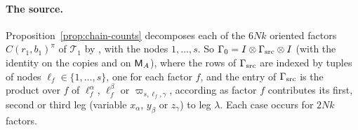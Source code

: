 \paragraph{The source.}
Proposition~\ref{prop:chain-counts} decomposes each of the \(6Nk\) oriented
factors \(C(r_1,b_1)^\pi\) of \(\mathcal T_1\) by
\citep[Lemma~9.1(a)]{FinCon26}, with the nodes \(1,\ldots,s\). So
\(\Gamma_0=I\otimes\Gamma_{\rm src}\otimes I\) (with the identity on the
copies and on \(\mathsf M_A\)), where the rows of \(\Gamma_{\rm src}\) are
indexed by tuples of nodes \(\ell_f\in\{1,\ldots,s\}\), one for each
factor \(f\), and the entry of \(\Gamma_{\rm src}\) is the product over
\(f\) of \(\ell_f^\alpha\), \(\ell_f^\beta\)
or \(\varpi_{s,\ell_f,\gamma}\), according as factor \(f\) contributes its
first, second or third leg (variable \(x_\alpha\), \(y_\beta\) or
\(z_\gamma\)) to leg \(\lambda\). Each case occurs for \(2Nk\) factors.

